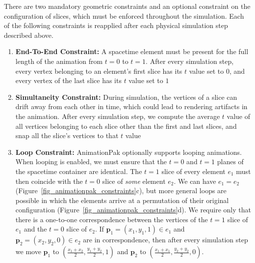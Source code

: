 
There are two mandatory geometric constraints and an optional constraint on the configuration of slices,
which must be enforced throughout the simulation.  Each of the following
constraints is reapplied after each physical simulation step described above.

\begin{enumerate}
\item \textbf{End-To-End Constraint:}
A spacetime element must be present for the full length of the animation
from $t=0$ to $t=1$.  After every simulation step, every vertex belonging
to an element's first slice has its $t$ value set to $0$, and every vertex
of the last slice has its $t$ value set to $1$

\item \textbf{Simultaneity Constraint:}
During simulation, the vertices of a slice can drift away from each
other in time, which could lead to rendering artifacts in the animation.
After every simulation step, we compute the average $t$ value of all
vertices belonging to each slice other than the first and last slices, and 
snap all the slice's vertices to that $t$ value 


\item \textbf{Loop Constraint:}
AnimationPak optionally supports looping animations.
When looping is enabled, we must ensure that the $t=0$ and $t=1$ planes
of the spacetime container are identical.  
The $t=1$ slice of every element $e_1$ must then 
coincide with the $t=0$ slice of \textit{some} 
element $e_2$.  We can have $e_1=e_2$ 
(Figure~\ref{fig_animationpak_constraints}c), but more general loops are possible in which
the elements arrive at a permutation of their original configuration
(Figure~\ref{fig_animationpak_constraints}d).  We require only that there is a one-to-one
correspondence between the vertices of the $t=1$ slice of $e_1$ and the
$t=0$ slice of $e_2$.  If $\bm{p}_1=(x_1,y_1,1)\in e_1$ and
$\bm{p}_2=(x_2,y_2,0)\in e_2$
are in correspondence, then after every simulation step we
move $\bm{p}_1$ to $(\frac{x_1+x_2}{2},\frac{y_1+y_2}{2},1)$ and
$\bm{p}_2$ to $(\frac{x_1+x_1}{2},\frac{y_2+y_2}{2},0)$.
\end{enumerate}


